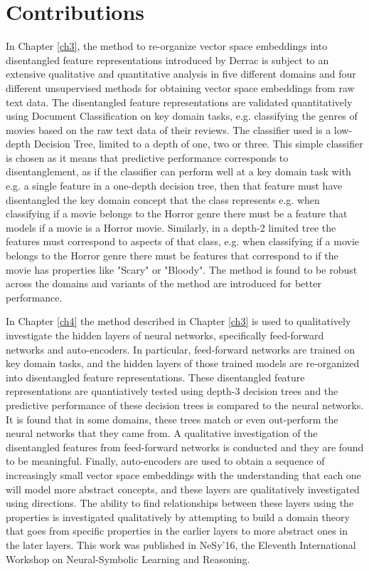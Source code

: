 \section{Contributions}


In Chapter \ref{ch3}, the method to re-organize vector space embeddings into disentangled feature representations introduced by Derrac \cite{Derrac2015} is subject to an extensive qualitative and quantitative analysis in five different domains and four different unsupervised methods for obtaining vector space embeddings from raw text data. The disentangled feature representations are validated quantitatively using Document Classification on key domain tasks, e.g. classifying the genres of movies based on the raw text data of their reviews. The classifier used is a low-depth Decision Tree, limited to a depth of one, two or three. This simple classifier is chosen as it means that predictive performance corresponds to disentanglement, as if the classifier can perform well at a key domain task with e.g. a single feature in a one-depth decision tree, then that feature must have disentangled the key domain concept that the class represents  e.g. when classifying if a movie belongs to the Horror genre there must be a feature that models if a movie is a Horror movie. Similarly, in a depth-2 limited tree the features must correspond to aspects of that class, e.g. when classifying if a movie belongs to the Horror genre there must be features that correspond to if the movie has properties like "Scary" or "Bloody". The method is found to be robust across the domains and variants of the method are introduced for better performance.

In Chapter \ref{ch4} the method described in Chapter \ref{ch3} is used to qualitatively investigate the hidden layers of neural networks, specifically feed-forward networks and auto-encoders. In particular, feed-forward networks are trained on key domain tasks, and the hidden layers of those trained models are re-organized into disentangled feature representations. These disentangled feature representations are quantiatively tested using depth-3 decision trees and the predictive performance of these decision trees is compared to the neural networks. It is found that in some domains, these trees match or even out-perform the neural networks that they came from. A qualitative investigation of the disentangled features from feed-forward networks is conducted and they are found to be meaningful. Finally, auto-encoders are used to obtain a sequence of increasingly small vector space embeddings with the understanding that each one will model more abstract concepts, and these layers are qualitatively investigated using directions. The ability to find relationships between these layers using the properties is investigated qualitatively by attempting to build a domain theory that goes from specific properties in the earlier layers to more abstract ones in the later layers. This work was published in NeSy'16, the Eleventh International Workshop on Neural-Symbolic Learning and Reasoning.

